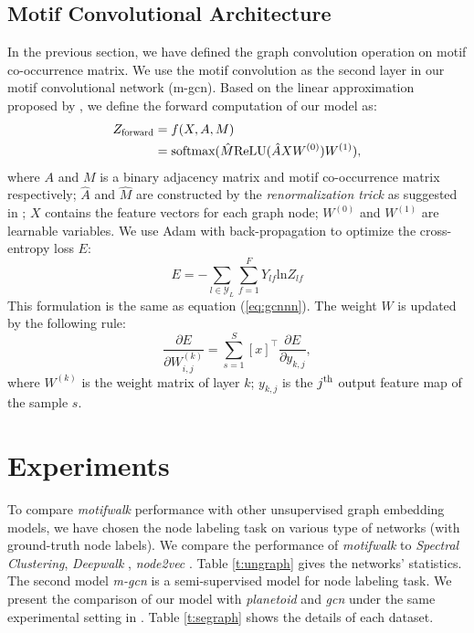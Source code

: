 \documentclass{article}
\theoremstyle{definition}
\begin{document}
\subsection{Motif Convolutional Architecture}

In the previous section, we have defined the graph convolution
operation on motif co-occurrence matrix. We use the motif convolution
as the second layer in our motif convolutional network (m-gcn). Based on the
linear approximation proposed by \citeauthor{gcn}, we define the forward
computation of our model as:
\begin{equation}
    \begin{aligned}
    Z_{\scalebox{0.75}{forward}} &= f(X,A,M) \\
    &= \mbox{softmax}(\hat{M} \mbox{ReLU}(\hat{A}XW^{(0)})W^{(1)}),
    \end{aligned}
    \label{eq:mforward}
\end{equation}
where $A$ and $M$ is a binary adjacency matrix and motif co-occurrence
matrix respectively; $\hat{A}$ and $\hat{M}$ are constructed by the
\emph{renormalization trick} as suggested in \cite{gcn}; $X$ contains
the feature vectors for each graph node; $W^{(0)}$ and $W^{(1)}$ are
learnable variables. We use Adam \cite{adam} with back-propagation
to optimize the cross-entropy loss $E$:
\begin{equation}
	E = -\sum_{l \in \mathcal{Y}_L} \sum^F_{f=1} Y_{lf}\mbox{ln} Z_{lf}
	\label{eq:mloss}
\end{equation}
This formulation is the same as equation (\ref{eq:gcnnn}). The weight $W$ is updated
by the following rule:
\begin{equation}
	\frac{\partial E}{\partial W^{(k)}_{i,j}} = \sum^S_{s=1} [x]^\top \frac{\partial E}{\partial y_{k,j}},
	\label{eq:mback}
\end{equation}
where $W^{(k)}$ is the weight matrix of layer $k$; $y_{k,j}$ is the
$j^{\scalebox{0.75}{th}}$ output feature map of the sample $s$.

\section{Experiments}

To compare \emph{motifwalk} performance with other unsupervised graph
embedding models, we have chosen the node labeling task on various
type of networks (with ground-truth node labels). We
compare the performance of \emph{motifwalk} to \emph{Spectral Clustering},
\emph{Deepwalk} \cite{deepwalk}, \emph{node2vec} \cite{node2vec}.
Table \ref{t:ungraph} gives the networks' statistics. The second model
\emph{m-gcn} is a semi-supervised model for node labeling task.
We present the comparison of our model with \emph{planetoid} and
\emph{gcn} under the same experimental setting in \cite{gcn}.
Table \ref{t:segraph} shows the details of each dataset.
\end{document}

